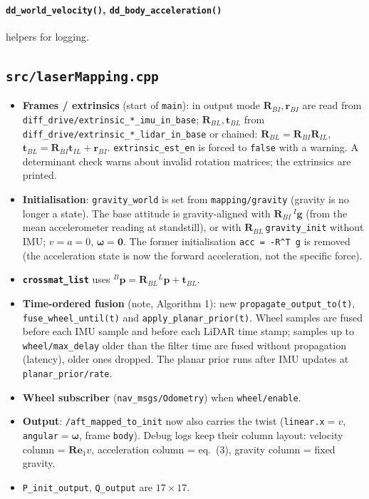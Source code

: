 \documentclass[11pt,a4paper]{article}
\newcommand{\f}[1]{\texttt{#1}}
\newcommand{\R}{\mathbf{R}}
\newcommand{\p}{\mathbf{p}}
\newcommand{\w}{\bm{\omega}}
\newcommand{\e}{\mathbf{e}}
\newcommand{\g}{\mathbf{g}}
\begin{document}
\paragraph{\f{dd\_world\_velocity()}, \f{dd\_body\_acceleration()}} helpers for logging.

\subsection{\f{src/laserMapping.cpp}}
\begin{itemize}
\item \textbf{Frames / extrinsics} (start of \f{main}): in output mode
  $\R_{BI},\mathbf r_{BI}$ are read from \f{diff\_drive/extrinsic\_*\_imu\_in\_base};
  $\R_{BL},\mathbf t_{BL}$ from \f{diff\_drive/extrinsic\_*\_lidar\_in\_base} or chained:
  $\R_{BL}=\R_{BI}\R_{IL}$, $\mathbf t_{BL}=\R_{BI}\mathbf t_{IL}+\mathbf r_{BI}$.
  \f{extrinsic\_est\_en} is forced to \f{false} with a warning. A determinant
  check warns about invalid rotation matrices; the extrinsics are printed.
\item \textbf{Initialisation}: \f{gravity\_world} is set from \f{mapping/gravity}
  (gravity is no longer a state). The base attitude is gravity-aligned with
  $\R_{BI}\,{}^I\g$ (from the mean accelerometer reading at standstill), or with
  $\R_{BL}\,$\f{gravity\_init} without IMU; $v=a=0$, $\w=\mathbf 0$. The former
  initialisation \f{acc = -R\^{}T g} is removed (the acceleration state is now the
  forward acceleration, not the specific force).
\item \textbf{\f{crossmat\_list}} uses $^B\p=\R_{BL}{}^L\p+\mathbf t_{BL}$.
\item \textbf{Time-ordered fusion} (note, Algorithm 1): new
  \f{propagate\_output\_to(t)}, \f{fuse\_wheel\_until(t)} and
  \f{apply\_planar\_prior(t)}. Wheel samples are fused before each IMU sample
  and before each LiDAR time stamp; samples up to \f{wheel/max\_delay} older than
  the filter time are fused without propagation (latency), older ones dropped.
  The planar prior runs after IMU updates at \f{planar\_prior/rate}.
\item \textbf{Wheel subscriber} (\f{nav\_msgs/Odometry}) when \f{wheel/enable}.
\item \textbf{Output}: \f{/aft\_mapped\_to\_init} now also carries the twist
  (\f{linear.x}$=v$, \f{angular}$=\w$, frame \f{body}). Debug logs keep their
  column layout: velocity column = $\R\e_1v$, acceleration column = eq.\ (3),
  gravity column = fixed gravity.
\item \f{P\_init\_output}, \f{Q\_output} are $17\times17$.
\end{itemize}
\end{document}

